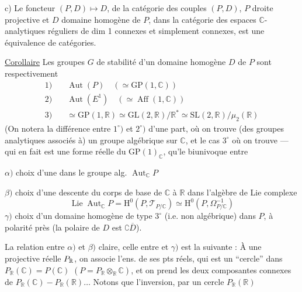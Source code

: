 c) Le foncteur $(P,D)\longmapsto D$, de la catégorie  des couples $(P,D)$, $P$ droite projective et $D$ domaine homogène de $P$, dans la catégorie  des espaces $\mathbb C$-analytiques réguliers de dim 1 connexes et simplement connexes, est une équivalence de catégories.

\uline{Corollaire} Les groupes $G$ de stabilité d'un domaine homogène $D$ de $P$ sont respectivement
\[
\begin{aligned}
1)\quad&\operatorname{Aut}(P)\quad(\simeq\mathrm{GP}(1,\mathbb C))\\
2)\quad&\operatorname{Aut}(E^1)\quad(\simeq\operatorname{Aff}(1,\mathbb C))\\
3)\quad&\simeq\mathrm{GP}(1,\mathbb R)\simeq\mathrm{GL}(2,\mathbb R)/\mathbb R^*\simeq\mathrm{SL}(2,\mathbb R)/\mu_2(\mathbb R)
\end{aligned}
\]
(On notera la différence entre $1^\circ)$ et $2^\circ)$ d'une part, où on trouve (des groupes analytiques associés à) un groupe algébrique sur $\mathbb C$, et le cas $3^\circ$
 où on trouve  --- qui en fait est une forme réelle du $\mathrm{GP}(1)_{\mathbb C}$,  qu'le   biunivoque entre

$\alpha)$ choix d'une  dans le groupe alg.  $\operatorname{Aut}_{\mathbb C}P$

$\beta)$ choix d'une descente du corps de base de $\mathbb C$ à $\mathbb R$ dans l'algèbre de Lie complexe
\[
\operatorname{Lie}\operatorname{Aut}_{\mathbb C}P=\mathrm H^0(P,\mathcal T_{P/\mathbb C})\simeq\mathrm H^0(P,\Omega^{-1}_{P/\mathbb C})
\]
$\gamma)$ choix d'un domaine homogène de type $3^\circ$ (i.e. non algébrique) dans $P$, à polarité près (la polaire de $D$ est $\complement\overline D$).

La relation entre $\alpha)$ et $\beta)$ claire, celle entre \unsure{$\delta)$|$\alpha)$} et $\gamma)$ est la suivante : À une  projective réelle ${P_{\mathbb R}}$, on associe l'ens. de ses pts réels, qui est un ``cercle'' dans $P_{\mathbb R}(\mathbb C)=P(\mathbb C)$ $(P=P_{\mathbb R}\otimes_{\mathbb R}\mathbb C)$, et on prend les deux composantes connexes de $P_{\mathbb R}(\mathbb C)-P_{\mathbb R}(\mathbb R)\ldots$ Notons que l'inversion, par un cercle $P_{\mathbb R}(\mathbb R)$

